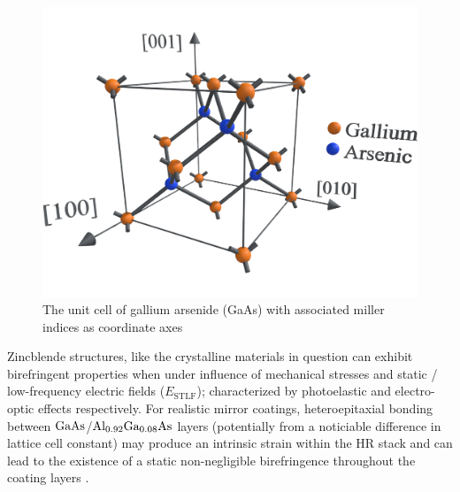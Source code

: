 \begin{figure}[!ht]
\begin{center}
\includegraphics[width=.5\textwidth]{figs/ALGAAS/gaas_unit_cell_mi.pdf}
\caption{The unit cell of gallium arsenide (GaAs) with associated miller indices as coordinate axes}
\end{center}
\label{fig:gaasuc}
\end{figure}

Zincblende structures, like the crystalline materials in question can exhibit birefringent properties when under influence of mechanical stresses and static / low-frequency electric fields ($E_\mathrm{STLF}$); characterized by photoelastic and electro-optic effects respectively. For realistic mirror coatings, heteroepitaxial bonding between $\mathrm{GaAs}$/$\mathrm{Al_{0.92}Ga_{0.08}As}$ layers (potentially from a noticiable difference in lattice cell constant) may produce an intrinsic strain within the HR stack and can lead to the existence of a static non-negligible birefringence throughout the coating layers \cite{cole:2016, adachi:1985}.

